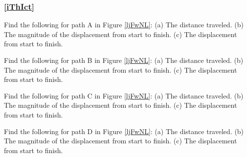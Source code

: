 \documentclass[dvipsnames]{article}
\begin{document}
\subsubsection*{\ref{iThIct} }

\begin{center}
\captionsetup{type=figure,margin=1in,font=scriptsize}
\label{ljFwNL}
\end{center}

\begin{exercise}
    Find the following for path A in Figure \ref{ljFwNL}: (a) The distance traveled. (b) The magnitude of the displacement from start to finish. (c) The displacement from start to finish.
\end{exercise}

\begin{exercise}
    Find the following for path B in Figure \ref{ljFwNL}: (a) The distance traveled. (b) The magnitude of the displacement from start to finish. (c) The displacement from start to finish.
\end{exercise}

\begin{exercise}
    Find the following for path C in Figure \ref{ljFwNL}: (a) The distance traveled. (b) The magnitude of the displacement from start to finish. (c) The displacement from start to finish.
\end{exercise}

\begin{exercise}
    Find the following for path D in Figure \ref{ljFwNL}: (a) The distance traveled. (b) The magnitude of the displacement from start to finish. (c) The displacement from start to finish.
\end{exercise}
\end{document}
